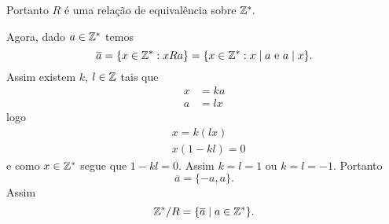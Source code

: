 \documentclass[12pt]{article}
\begin{document}
	Portanto $R$ é uma relação de equivalência sobre $\mathbb{Z}^*.$

	Agora, dado $a \in \mathbb{Z}^*$ temos
	\[
		\overline{a} = \{x \in \mathbb{Z}^* : xRa\} = \{ x \in \mathbb{Z}^* : x \mid a \mbox{ e } a \mid x\}.
	\]
	Assim existem $k$, $l \in \mathbb{Z}$ tais que
	\begin{align*}
		x &= ka\\
		a &= lx
	\end{align*}
	logo
	\begin{align*}
		&x = k(lx)\\
		&x(1 - kl) = 0
	\end{align*}
	e como $x \in \mathbb{Z}^*$ segue que $1 - kl = 0$. Assim $k = l = 1$ ou $k = l = -1$. Portanto
	\[
		\overline{a} = \{-a,a\}.
	\]
	Assim
	\[
		\mathbb{Z}^*/R = \{\overline{a} \mid a \in \mathbb{Z}^*\}.
	\]
\end{document}
